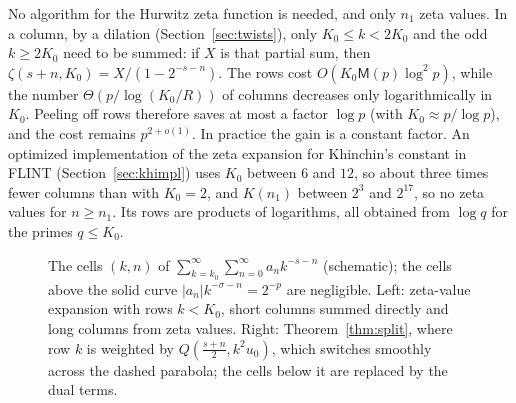 \documentclass[11pt,reqno]{amsart}
\theoremstyle{definition}
\theoremstyle{remark}
\newcommand{\Mul}{\mathsf{M}}
\begin{document}
No algorithm for the Hurwitz zeta function is needed, and only $n_1$ zeta values. In a column, by a dilation (Section~\ref{sec:twists}),
only $K_0 \le k < 2K_0$ and the odd $k \ge 2K_0$ need to be summed: if $X$ is that
partial sum, then $\zeta(s+n, K_0) = X/(1 - 2^{-s-n})$. The rows cost $O(K_0\Mul(p)\log^2p)$, while the
number $\Theta(p/\log(K_0/R))$ of columns decreases only logarithmically in $K_0$. Peeling off rows therefore saves at most a
factor $\log p$ (with $K_0 \approx p/\log p$), and the cost remains $p^{2+o(1)}$. In practice the gain is a constant factor.
An optimized implementation of the zeta expansion for Khinchin's constant in FLINT (Section~\ref{sec:khimpl}) uses $K_0$ between $6$ and $12$, so
about three times fewer columns than with $K_0 = 2$, and $K(n_1)$ between $2^3$ and $2^{17}$, so no zeta values for
$n \ge n_1$. Its rows are products of logarithms, all obtained from $\log q$ for the primes $q \le K_0$.

\begin{figure}[ht]
\centering
{}
\hfil
{}
\caption{The cells $(k, n)$ of $\sum_{k=k_0}^{\infty}\sum_{n=0}^{\infty}a_nk^{-s-n}$ (schematic); the cells above the
solid curve $|a_n|k^{-\sigma-n} = 2^{-p}$ are negligible. Left: zeta-value expansion with rows $k < K_0$, short columns
summed directly and long columns from zeta values. Right: Theorem~\ref{thm:split}, where row $k$ is weighted by
$Q(\frac{s+n}2, k^2u_0)$, which switches smoothly across the dashed parabola; the cells below it are replaced by
the dual terms.}
\label{fig:cells}
\end{figure}
\end{document}
